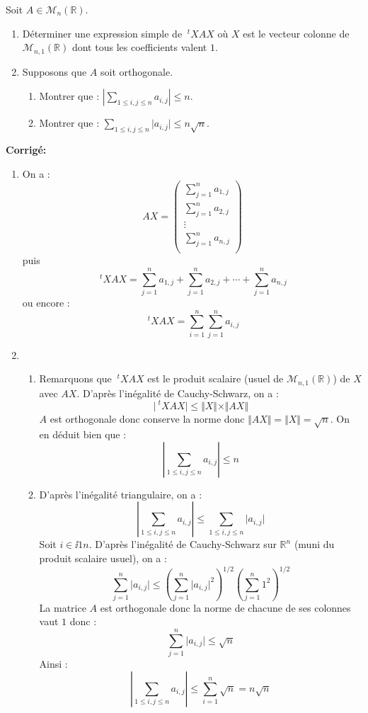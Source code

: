 \documentclass[a4paper,twoside,french,11pt]{VcCours}
\newcommand{\corr}{\textbf{Corrigé:}}
\begin{document}
\begin{Exercice}{} Soit $A \in \mathcal{M}_n(\mathbb{R})$.

\begin{enumerate}
\item Déterminer une expression simple de $~^tX A X$ où $X$ est le vecteur colonne de $\mathcal{M}_{n,1}(\mathbb{R})$ dont tous les coefficients valent $1$.  
\item Supposons que $A$ soit orthogonale.
\begin{enumerate}
\item Montrer que : $\left\vert \sum_{1 \leq i,j \leq n} a_{i,j} \right\vert \leq n$.
\item Montrer que : $ \sum_{1 \leq i,j \leq n} \vert a_{i,j} \vert  \leq n \sqrt{n}$.
\end{enumerate}
\end{enumerate}
\end{Exercice}

\corr

\begin{enumerate}
\item On a :
$$ AX = \begin{pmatrix}
\sum_{j=1}^n a_{1,j} \\
\sum_{j=1}^n a_{2,j} \\ 
\vdots \\
\sum_{j=1}^n a_{n,j} \\
\end{pmatrix}$$
puis 
$$ ~^tX A X =\sum_{j=1}^n a_{1,j} + \sum_{j=1}^n a_{2,j} + \cdots + \sum_{j=1}^n a_{n,j}$$
ou encore :
$$  ~^tX A X = \sum_{i=1}^n \sum_{j=1}^n a_{i,j}$$
\item
\begin{enumerate}
\item Remarquons que $~^tX A X$ est le produit scalaire (usuel de $\mathcal{M}_{n,1}(\mathbb{R})$) de $X$ avec $AX$. D'après l'inégalité de Cauchy-Schwarz, on a :
$$ \vert ~^tX A X \vert \leq \Vert X \Vert \times \Vert AX \Vert$$
$A$ est orthogonale donc conserve la norme donc $\Vert AX \Vert = \Vert X \Vert = \sqrt{n}$. On en déduit bien que :
$$ \left\vert \sum_{1 \leq i,j \leq n} a_{i,j} \right\vert \leq n$$
\item D'après l'inégalité triangulaire, on a :
$$ \left\vert \sum_{1 \leq i,j \leq n} a_{i,j} \right\vert \leq  \sum_{1 \leq i,j \leq n} \vert a_{i,j}  \vert$$
Soit $i \in \ii{1}{n}$. D'après l'inégalité de Cauchy-Schwarz sur $\mathbb{R}^n$ (muni du produit scalaire usuel), on a :
$$ \sum_{j=1}^n \vert a_{i,j}  \vert \leq \left(\sum_{j=1}^n \vert a_{i,j}  \vert^2 \right)^{1/2}  \left(\sum_{j=1}^n 1^2 \right)^{1/2}$$
La matrice $A$ est orthogonale donc la norme de chacune de ses colonnes vaut $1$ donc :
$$  \sum_{j=1}^n \vert a_{i,j}  \vert \leq  \sqrt{n}$$
Ainsi :
$$ \left\vert \sum_{1 \leq i,j \leq n} a_{i,j} \right\vert \leq \sum_{i=1}^n \sqrt{n} = n \sqrt{n}$$
\end{enumerate}
\end{enumerate}
\end{document}
